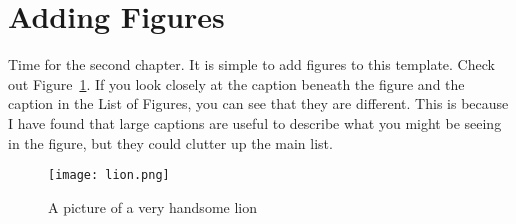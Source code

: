 \section{Adding Figures}

Time for the second chapter.  It is simple to add figures to this template.  Check out Figure~\ref{fig:figure1}.  If you look closely at the caption beneath the figure and the caption in the List of Figures, you can see that they are different.  This is because I have found that large captions are useful to describe what you might be seeing in the figure, but they could clutter up the main list.  

	
	\begin{figure}[!ht]
		\centering
		\texttt{[image: lion.png]}
		\caption[SHORT LABEL]{A picture of a very handsome lion}
		\label{fig:figure1}
	\end{figure}




